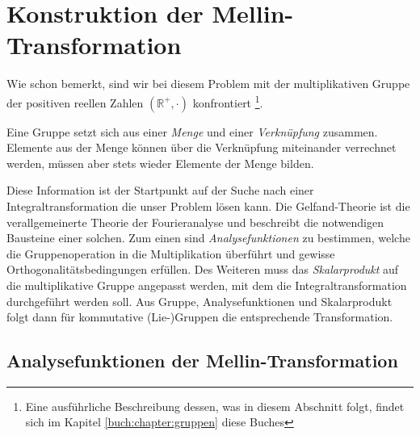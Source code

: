 %
%
%

\section{Konstruktion der Mellin-Transformation
\label{mellin:section:teil2}}
Wie schon bemerkt, sind wir bei diesem Problem mit der multiplikativen 
Gruppe der positiven reellen Zahlen $(\mathbb{R^+},\cdot)$ konfrontiert
\footnote{Eine ausführliche Beschreibung dessen, was in diesem Abschnitt 
folgt, findet sich im Kapitel \ref{buch:chapter:gruppen} diese Buches}.
\begin{definition}
    Eine Gruppe setzt sich aus einer {\em Menge} und einer 
    {\em Verknüpfung} zusammen. 
    Elemente aus der Menge können über die Verknüpfung miteinander 
    verrechnet werden, müssen aber stets wieder Elemente der Menge bilden.
\end{definition}
Diese Information ist der Startpunkt auf der Suche nach einer 
Integraltransformation die unser Problem lösen kann.
Die Gelfand-Theorie ist die verallgemeinerte Theorie der Fourieranalyse und 
beschreibt die notwendigen Bausteine einer solchen.
Zum einen sind {\em Analysefunktionen} zu bestimmen, welche die 
Gruppenoperation in die Multiplikation überführt und gewisse 
Orthogonalitätsbedingungen erfüllen. 
Des Weiteren muss das {\em Skalarprodukt} auf die multiplikative Gruppe 
angepasst werden, mit dem die Integraltransformation durchgeführt werden 
soll.
Aus Gruppe, Analysefunktionen und Skalarprodukt folgt dann
für kommutative (Lie-)Gruppen die entsprechende Transformation.





\subsection{Analysefunktionen der Mellin-Transformation
\label{mellin:subsection:analysefunktionen}}

